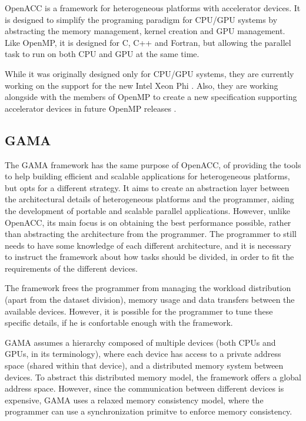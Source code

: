 OpenACC \cite{OpenACC} is a framework for heterogeneous platforms with accelerator devices. It is designed to simplify the programing paradigm for CPU/GPU systems by abstracting the memory management, kernel creation and GPU management. Like OpenMP, it is designed for C, C++ and Fortran, but allowing the parallel task to run on both CPU and GPU at the same time.

While it was originally designed only for CPU/GPU systems, they are currently working on the support for the new Intel Xeon Phi \cite{OpenACC:HPCWire}. Also, they are working alongside with the members of OpenMP to create a new specification supporting accelerator devices in future OpenMP releases \cite{OpenACC:OpenMP}.

\subsection{GAMA}

The GAMA framework \cite{GAMA} has the same purpose of OpenACC, of providing the tools to help building efficient and scalable applications for heterogeneous platforms, but opts for a different strategy. It aims to create an abstraction layer between the architectural details of heterogeneous platforms and the programmer, aiding the development of portable and scalable parallel applications. However, unlike OpenACC, its main focus is on obtaining the best performance possible, rather than abstracting the architecture from the programmer. The programmer to still needs to have some knowledge of each different architecture, and it is necessary to instruct the framework about how tasks should be divided, in order to fit the requirements of the different devices.

The framework frees the programmer from managing the workload distribution (apart from the dataset division), memory usage and data transfers between the available devices. However, it is possible for the programmer to tune these specific details, if he is confortable enough with the framework.

GAMA assumes a hierarchy composed of multiple devices (both CPUs and GPUs, in its terminology), where each device has access to a private address space (shared within that device), and a distributed memory system between devices. To abstract this distributed memory model, the framework offers a global address space. However, since the communication between different devices is expensive, GAMA uses a relaxed memory consistency model, where the programmer can use a synchronization primitve to enforce memory consistency.

